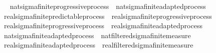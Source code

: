 \begin{isabellebody}
\isadelimproof
\ %
\endisadelimproof
%
\isatagproof
\isacommand{{\isachardot}{\kern0pt}{\isachardot}{\kern0pt}}\isamarkupfalse%
%
\endisatagproof
{\isafoldproof}%
%
\isadelimproof
%
\endisadelimproof
\isanewline
{}\isamarkupfalse%
\ nat{\isacharunderscore}{\kern0pt}sigma{\isacharunderscore}{\kern0pt}finite{\isacharunderscore}{\kern0pt}progressive{\isacharunderscore}{\kern0pt}process\ {\isasymsubseteq}\ nat{\isacharunderscore}{\kern0pt}sigma{\isacharunderscore}{\kern0pt}finite{\isacharunderscore}{\kern0pt}adapted{\isacharunderscore}{\kern0pt}process%
\isadelimproof
\ %
\endisadelimproof
%
\isatagproof
\isacommand{{\isachardot}{\kern0pt}{\isachardot}{\kern0pt}}\isamarkupfalse%
%
\endisatagproof
{\isafoldproof}%
%
\isadelimproof
%
\endisadelimproof
\ \isanewline
\isanewline
{}\isamarkupfalse%
\ real{\isacharunderscore}{\kern0pt}sigma{\isacharunderscore}{\kern0pt}finite{\isacharunderscore}{\kern0pt}predictable{\isacharunderscore}{\kern0pt}process\ {\isasymsubseteq}\ real{\isacharunderscore}{\kern0pt}sigma{\isacharunderscore}{\kern0pt}finite{\isacharunderscore}{\kern0pt}progressive{\isacharunderscore}{\kern0pt}process%
\isadelimproof
\ %
\endisadelimproof
%
\isatagproof
\isacommand{{\isachardot}{\kern0pt}{\isachardot}{\kern0pt}}\isamarkupfalse%
%
\endisatagproof
{\isafoldproof}%
%
\isadelimproof
%
\endisadelimproof
\isanewline
{}\isamarkupfalse%
\ real{\isacharunderscore}{\kern0pt}sigma{\isacharunderscore}{\kern0pt}finite{\isacharunderscore}{\kern0pt}progressive{\isacharunderscore}{\kern0pt}process\ {\isasymsubseteq}\ real{\isacharunderscore}{\kern0pt}sigma{\isacharunderscore}{\kern0pt}finite{\isacharunderscore}{\kern0pt}adapted{\isacharunderscore}{\kern0pt}process%
\isadelimproof
\ %
\endisadelimproof
%
\isatagproof
\isacommand{{\isachardot}{\kern0pt}{\isachardot}{\kern0pt}}\isamarkupfalse%
%
\endisatagproof
{\isafoldproof}%
%
\isadelimproof
%
\endisadelimproof
\isanewline
\isanewline
{}\isamarkupfalse%
\ nat{\isacharunderscore}{\kern0pt}sigma{\isacharunderscore}{\kern0pt}finite{\isacharunderscore}{\kern0pt}adapted{\isacharunderscore}{\kern0pt}process\ {\isasymsubseteq}\ nat{\isacharunderscore}{\kern0pt}filtered{\isacharunderscore}{\kern0pt}sigma{\isacharunderscore}{\kern0pt}finite{\isacharunderscore}{\kern0pt}measure%
\isadelimproof
\ %
\endisadelimproof
%
\isatagproof
\isacommand{{\isachardot}{\kern0pt}{\isachardot}{\kern0pt}}\isamarkupfalse%
%
\endisatagproof
{\isafoldproof}%
%
\isadelimproof
%
\endisadelimproof
\isanewline
{}\isamarkupfalse%
\ real{\isacharunderscore}{\kern0pt}sigma{\isacharunderscore}{\kern0pt}finite{\isacharunderscore}{\kern0pt}adapted{\isacharunderscore}{\kern0pt}process\ {\isasymsubseteq}\ real{\isacharunderscore}{\kern0pt}filtered{\isacharunderscore}{\kern0pt}sigma{\isacharunderscore}{\kern0pt}finite{\isacharunderscore}{\kern0pt}measure%

\end{isabellebody}
